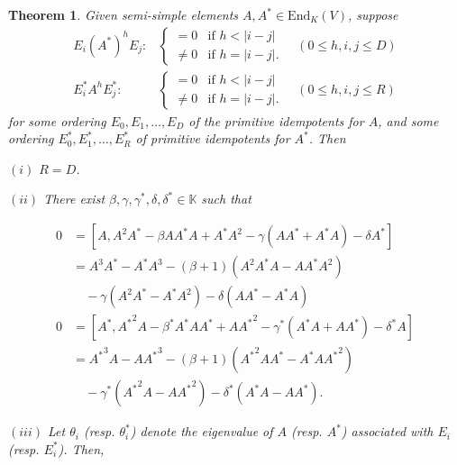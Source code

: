 \documentclass[
]{book}
\newtheorem{theorem}{Theorem}[chapter]
\theoremstyle{definition}
\theoremstyle{definition}
\theoremstyle{definition}
\theoremstyle{definition}
\theoremstyle{remark}
\begin{document}
\begin{theorem}
\protect\hypertarget{thm:aastar}{}\label{thm:aastar}Given semi-simple elements \(A, A^*\in \mathrm{End}_K(V)\), suppose
\begin{align}
E_i(A^*)^hE_j: & \begin{cases} = 0 & \text{if } h < |i-j|\\
\neq 0 & \text{if } h = |i-j|.\end{cases} \quad (0\leq h,i,j\leq D) \label{eq:eastare}\\
E^*_iA^hE^*_j: & \begin{cases} = 0 & \text{if } h < |i-j|\\
\neq 0 & \text{if } h = |i-j|.\end{cases} \quad (0\leq h,i,j\leq R) \label{eq:estaraestar}
\end{align}
for some ordering \(E_0, E_1, \ldots, E_D\) of the primitive idempotents for \(A\), and some ordering \(E^*_0, E^*_1, \ldots, E^*_R\) of primitive idempotents for \(A^*\). Then

\((i)\) \(R = D\).

\((ii)\) There exist \(\beta, \gamma, \gamma^*, \delta, \delta^*\in \mathbb{K}\) such that

\begin{align}
0 & = [A, A^2A^*-\beta AA^*A + A^*A^2 - \gamma(AA^*+A^*A) - \delta A^*]  \label{eq:abracket}\\
& = A^3A^*-A^*A^3 - (\beta+1)(A^2A^*A-AA^*A^2)\\
& \quad -\gamma(A^2A^*-A^*A^2)-\delta(AA^*-A^*A)  \label{eq:aastar}\\
0 & = [A^*, {A^*}^2A-\beta^* A^*AA^* + A{A^*}^2 - \gamma^*(A^*A+AA^*) - \delta^* A]  \label{eq:astarbracket}\\
& = {A^*}^3A - A{A^*}^3 - (\beta+1)({A^*}^2AA^*-A^*A{A^*}^2)\\
& \quad -\gamma^*({A^*}^2A-A{A^*}^2)-\delta^*(A^*A-AA^*).  \label{eq:astara}
\end{align}

\((iii)\) Let \(\theta_i\) (resp. \(\theta^*_i\)) denote the eigenvalue of \(A\) (resp. \(A^*\)) associated with \(E_i\) (resp. \(E^*_i\)). Then,


\end{theorem}
\end{document}
